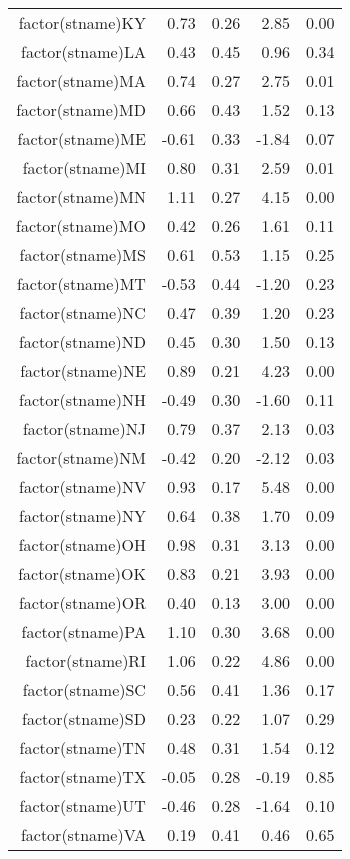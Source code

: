 \begin{table}[ht]
\begin{tabular}{rrrrr}
  factor(stname)KY & 0.73 & 0.26 & 2.85 & 0.00 \\ 
  factor(stname)LA & 0.43 & 0.45 & 0.96 & 0.34 \\ 
  factor(stname)MA & 0.74 & 0.27 & 2.75 & 0.01 \\ 
  factor(stname)MD & 0.66 & 0.43 & 1.52 & 0.13 \\ 
  factor(stname)ME & -0.61 & 0.33 & -1.84 & 0.07 \\ 
  factor(stname)MI & 0.80 & 0.31 & 2.59 & 0.01 \\ 
  factor(stname)MN & 1.11 & 0.27 & 4.15 & 0.00 \\ 
  factor(stname)MO & 0.42 & 0.26 & 1.61 & 0.11 \\ 
  factor(stname)MS & 0.61 & 0.53 & 1.15 & 0.25 \\ 
  factor(stname)MT & -0.53 & 0.44 & -1.20 & 0.23 \\ 
  factor(stname)NC & 0.47 & 0.39 & 1.20 & 0.23 \\ 
  factor(stname)ND & 0.45 & 0.30 & 1.50 & 0.13 \\ 
  factor(stname)NE & 0.89 & 0.21 & 4.23 & 0.00 \\ 
  factor(stname)NH & -0.49 & 0.30 & -1.60 & 0.11 \\ 
  factor(stname)NJ & 0.79 & 0.37 & 2.13 & 0.03 \\ 
  factor(stname)NM & -0.42 & 0.20 & -2.12 & 0.03 \\ 
  factor(stname)NV & 0.93 & 0.17 & 5.48 & 0.00 \\ 
  factor(stname)NY & 0.64 & 0.38 & 1.70 & 0.09 \\ 
  factor(stname)OH & 0.98 & 0.31 & 3.13 & 0.00 \\ 
  factor(stname)OK & 0.83 & 0.21 & 3.93 & 0.00 \\ 
  factor(stname)OR & 0.40 & 0.13 & 3.00 & 0.00 \\ 
  factor(stname)PA & 1.10 & 0.30 & 3.68 & 0.00 \\ 
  factor(stname)RI & 1.06 & 0.22 & 4.86 & 0.00 \\ 
  factor(stname)SC & 0.56 & 0.41 & 1.36 & 0.17 \\ 
  factor(stname)SD & 0.23 & 0.22 & 1.07 & 0.29 \\ 
  factor(stname)TN & 0.48 & 0.31 & 1.54 & 0.12 \\ 
  factor(stname)TX & -0.05 & 0.28 & -0.19 & 0.85 \\ 
  factor(stname)UT & -0.46 & 0.28 & -1.64 & 0.10 \\ 
  factor(stname)VA & 0.19 & 0.41 & 0.46 & 0.65 \\ 

\end{tabular}
\end{table}
